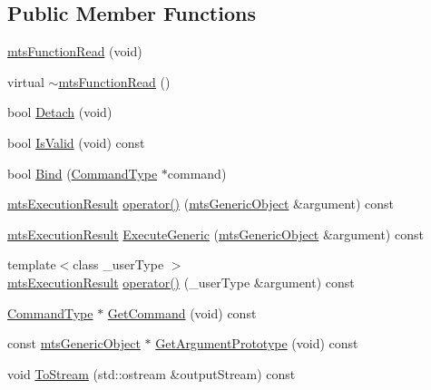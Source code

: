 \subsection*{Public Member Functions}
\begin{DoxyCompactItemize}
\item 
\hyperlink{classmts_function_read_ae791f29d3c9f2693ceb78bd71fa3d4fb}{mts\-Function\-Read} (void)
\item 
virtual \hyperlink{classmts_function_read_ad6186a1cc7dc8a6421614f1ad5b3e5bb}{$\sim$mts\-Function\-Read} ()
\item 
bool \hyperlink{classmts_function_read_a2699ffdba2c35a0ab4d4523087a54388}{Detach} (void)
\item 
bool \hyperlink{classmts_function_read_a7db527fe7b6259077e7f430a02aaf663}{Is\-Valid} (void) const 
\item 
bool \hyperlink{classmts_function_read_a72de23edef8c36bb005c4e3aee3f7ba3}{Bind} (\hyperlink{classmts_function_read_ac29fb3db043f94da5d51fe37860b1015}{Command\-Type} $\ast$command)
\item 
\hyperlink{classmts_execution_result}{mts\-Execution\-Result} \hyperlink{classmts_function_read_ac3935ec6461023a8c050360dbb38e502}{operator()} (\hyperlink{classmts_generic_object}{mts\-Generic\-Object} \&argument) const 
\item 
\hyperlink{classmts_execution_result}{mts\-Execution\-Result} \hyperlink{classmts_function_read_aaa874a5d2a1e8b611b4b4e598dccb710}{Execute\-Generic} (\hyperlink{classmts_generic_object}{mts\-Generic\-Object} \&argument) const 
\item 
{\footnotesize template$<$class \-\_\-user\-Type $>$ }\\\hyperlink{classmts_execution_result}{mts\-Execution\-Result} \hyperlink{classmts_function_read_afcef5572de1b1a9b5beb221368e10cb9}{operator()} (\-\_\-user\-Type \&argument) const 
\item 
\hyperlink{classmts_function_read_ac29fb3db043f94da5d51fe37860b1015}{Command\-Type} $\ast$ \hyperlink{classmts_function_read_a51014fa5c58bf17f256de7d9ad89771d}{Get\-Command} (void) const 
\item 
const \hyperlink{classmts_generic_object}{mts\-Generic\-Object} $\ast$ \hyperlink{classmts_function_read_a4473bcdb760ef64ba50e70a8e8d261d6}{Get\-Argument\-Prototype} (void) const 
\item 
void \hyperlink{classmts_function_read_a41f1739c5fbdaa2ccc8f46e806234f22}{To\-Stream} (std\-::ostream \&output\-Stream) const 
\end{DoxyCompactItemize}
